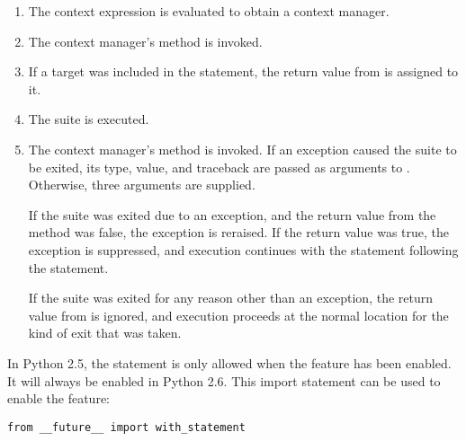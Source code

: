 \begin{enumerate}

\item The context expression is evaluated to obtain a context manager.

\item The context manager's  method is invoked.

\item If a target was included in the 
statement, the return value from  is assigned to it.


\item The suite is executed.

\item The context manager's  method is invoked. If
an exception caused the suite to be exited, its type, value, and
traceback are passed as arguments to . Otherwise,
three  arguments are supplied.

If the suite was exited due to an exception, and the return
value from the  method was false, the exception is
reraised. If the return value was true, the exception is suppressed, and
execution continues with the statement following the 
statement.

If the suite was exited for any reason other than an exception, the
return value from  is ignored, and execution proceeds
at the normal location for the kind of exit that was taken.

\end{enumerate}

\begin{notice}
In Python 2.5, the  statement is only allowed
when the  feature has been enabled.  It will always
be enabled in Python 2.6.  This  import statement can
be used to enable the feature:

\begin{verbatim}
from __future__ import with_statement
\end{verbatim}
\end{notice}

